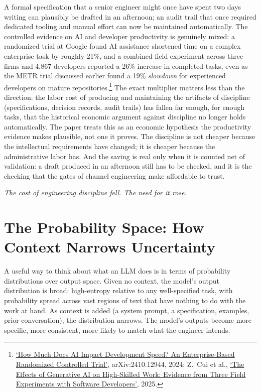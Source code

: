 \documentclass[11pt, a4paper]{article}
\newcommand{\pullquote}[1]{%
  \begin{pullquoteenv}%
    {\setstretch{1.35}\fontsize{11.5}{16}\itshape\color{indigo} #1}%
  \end{pullquoteenv}%
}
\begin{document}
A formal specification that a senior engineer might once have spent two days writing can
plausibly be drafted in an afternoon; an audit trail that once required dedicated tooling
and manual effort can now be maintained automatically. The controlled evidence on AI and
developer productivity is genuinely mixed: a randomized trial at Google found AI
assistance shortened time on a complex enterprise task by roughly 21\%, and a combined
field experiment across three firms and 4{,}867 developers reported a 26\% increase in
completed tasks, even as the METR trial discussed earlier found a 19\% \emph{slowdown} for
experienced developers on mature repositories.\footnote{\href{https://arxiv.org/abs/2410.12944}{`How
Much Does AI Impact Development Speed? An Enterprise-Based Randomized Controlled Trial'},
arXiv:2410.12944, 2024; Z.~Cui et al., \href{https://www.microsoft.com/en-us/research/publication/the-effects-of-generative-ai-on-high-skilled-work-evidence-from-three-field-experiments-with-software-developers/}{`The
Effects of Generative AI on High-Skilled Work: Evidence from Three Field Experiments with
Software Developers'}, 2025.} The exact multiplier matters less than the direction: the labor
cost of producing and maintaining the artifacts of discipline (specifications, decision
records, audit trails) has fallen far enough, for enough tasks, that the historical
economic argument against discipline no longer holds automatically. The paper treats
this as an economic hypothesis the productivity evidence makes plausible, not one it
proves. The discipline is not
cheaper because the intellectual requirements have changed; it is cheaper because the
administrative labor has. And the saving is real only when it is counted net of
validation: a draft produced in an afternoon still has to be checked, and it is the
checking that the gates of channel engineering make affordable to trust.

\pullquote{The cost of engineering discipline fell. The need for it rose.}


\section{The Probability Space: How Context Narrows Uncertainty}

A useful way to think about what an LLM does is in terms of probability distributions
over output space. Given no context, the model's output distribution is broad:
high-entropy relative to any well-specified task, with probability spread across vast
regions of text that have nothing to do with the work at hand. As
context is added (a system prompt, a specification, examples, prior
conversation), the distribution narrows. The model's outputs become more specific, more
consistent, more likely to match what the engineer intends.
\end{document}
